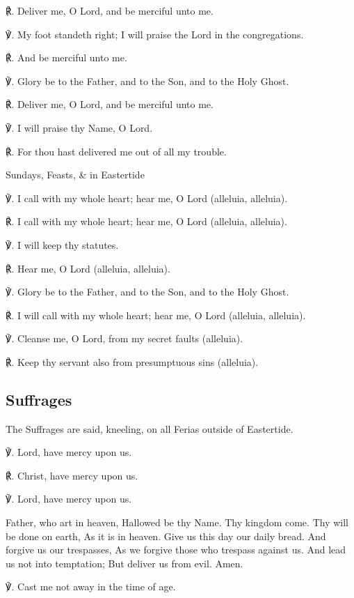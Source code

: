 \begin{multicols}{2}
℟. Deliver me, O Lord, and be merciful unto me.

℣. My foot standeth right; I will praise the Lord in the congregations.

℟. And be merciful unto me.

℣. Glory be to the Father, and to the Son, and to the Holy Ghost.
    
℟. Deliver me, O Lord, and be merciful unto me.

℣. I will praise thy Name, O Lord.

℟. For thou hast delivered me out of all my trouble.

\begin{inhead}
	Sundays, Feasts, \& in Eastertide
\end{inhead}

℣. I call with my whole heart; hear me, O Lord (alleluia, alleluia).

℟. I call with my whole heart; hear me, O Lord (alleluia, alleluia).

℣. I will keep thy statutes.

℟. Hear me, O Lord (alleluia, alleluia).

℣. Glory be to the Father, and to the Son, and to the Holy Ghost.

℟. I will call with my whole heart; hear me, O Lord (alleluia, alleluia).

℣. Cleanse me, O Lord, from my secret faults (alleluia).

℟. Keep thy servant also from presumptuous sins (alleluia).

\subsection{Suffrages}
\begin{rubric}
	The Suffrages are said, kneeling, on all Ferias outside of Eastertide.
\end{rubric}

℣. Lord, have mercy upon us.

℟. Christ, have mercy upon us.

℣. Lord, have mercy upon us.

 Father, who art in heaven, Hallowed be thy Name. Thy kingdom come. Thy will be done on earth, As it is in heaven. Give us this day our daily bread. And forgive us our trespasses, As we forgive those who trespass against us. And lead us not into temptation; But deliver us from evil. Amen.

℣. Cast me not away in the time of age.


\end{multicols}
